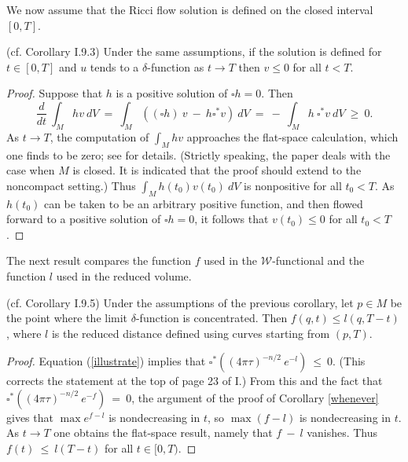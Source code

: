 We now assume that the Ricci flow solution is defined on
the closed interval $[0, T]$.


\begin{corollary}
  \label{cor:kl-perelman-s-differential-harnack-inequality-harnack-inequalities-corollary}
 (cf. Corollary I.9.3) \label{corI.9.3}
Under the same assumptions, if the solution is defined for
$t \in [0,T]$
and $u$ tends to a $\delta$-function as
$t \rightarrow T$ then $v \le 0$ for all $t < T$.
\end{corollary}
\begin{proof}
Suppose that $h$ is a positive solution of $\square h = 0$. Then
\begin{equation}
\frac{d}{dt} \: \int_M h v \: dV \: = \:
\int_M \left( (\square h) \: v \: - \:
h \square^* v \right) \:  dV \: = \:
- \: \int_M h \: \square^* v \: dV \: \ge \: 0.
\end{equation}
As $t \rightarrow T$, the computation of $\int_M hv$ approaches
the flat-space calculation, which one finds to be zero; see
\cite{Ni} for details.
(Strictly speaking, the paper \cite{Ni} deals with the case when
$M$ is closed. It is indicated that the proof should extend to the
noncompact setting.)
Thus
$\int_M h(t_0) v(t_0) \: dV$ is nonpositive for all $t_0<T$. As $h(t_0)$ can be
taken to be an arbitrary positive function, and then flowed forward to
a positive solution of $\square h = 0$, it follows that
$v(t_0) \le 0$ for all $t_0 < T$.
\end{proof}

The next result compares the function $f$ used in the ${\mathcal  W}$-functional
and the function $l$ used in the reduced volume.

\begin{corollary}
  \label{cor:kl-perelman-s-differential-harnack-inequality-convergence-harnack-inequalities}
 (cf. Corollary I.9.5) \label{compare}
Under the assumptions of the previous corollary, let $p \in M$ be the
point where the limit $\delta$-function is concentrated. Then
$f(q,t) \le l(q, T-t)$, where $l$ is the reduced distance defined using
curves starting from $(p, T)$.
\end{corollary}
\begin{proof}
Equation (\ref{illustrate}) implies that
$\square^* \left( (4 \pi \tau)^{-n/2} \: e^{-l} \right) \: \le \: 0$.
(This corrects the statement at the top of page 23 of I.)
From this and the fact that
$\square^* \left( (4 \pi \tau)^{-n/2} \: e^{-f} \right) \: = \: 0$,
the argument of the proof of Corollary \ref{whenever}  gives that
$\max e^{f-l}$ is nondecreasing in $t$, so
$\max (f-l)$ is nondecreasing in $t$. As $t \rightarrow T$ one
obtains the flat-space result, namely that $f \: - \: l$
vanishes.  Thus $f(t) \: \le \: l(T - t)$ for all $t \in [0, T)$.
\end{proof}

